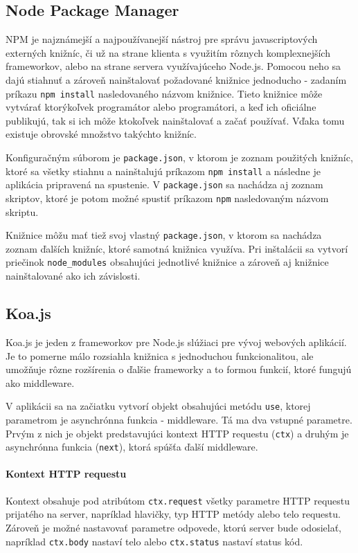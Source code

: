 \documentclass[
  digital, %
  table,   %
  lof,     %
  lot,     %
]{fithesis3}
\begin{document}
\subsection{Node Package Manager}
NPM je najznámejší a najpoužívanejší nástroj pre správu javascriptových externých knižníc, či už na strane klienta s využitím rôznych komplexnejších frameworkov, alebo na strane servera využívajúceho Node.js. Pomocou neho sa dajú stiahnuť a zároveň nainštalovať požadované knižnice jednoducho - zadaním príkazu \texttt{npm install} nasledovaného názvom knižnice. Tieto knižnice môže vytvárať ktorýkoľvek programátor alebo programátori, a keď ich oficiálne publikujú, tak si ich môže ktokoľvek nainštalovať a začať používať. Vďaka tomu existuje obrovské množstvo takýchto knižníc.

Konfiguračným súborom je \texttt{package.json}, v ktorom je zoznam použitých knižníc, ktoré sa všetky stiahnu a nainštalujú príkazom \texttt{npm install} a následne je aplikácia pripravená na spustenie. V \texttt{package.json} sa nachádza aj zoznam skriptov, ktoré je potom možné spustiť príkazom \texttt{npm} nasledovaným názvom skriptu.

Knižnice môžu mať tiež svoj vlastný \texttt{package.json}, v ktorom sa nachádza zoznam ďalších knižníc, ktoré samotná knižnica využíva. Pri inštalácii sa vytvorí priečinok \texttt{node\_modules} obsahujúci jednotlivé knižnice a zároveň aj knižnice nainštalované ako ich závislosti.

\subsection{Koa.js}
Koa.js je jeden z frameworkov pre Node.js slúžiaci pre vývoj webových aplikácií. Je to pomerne málo rozsiahla knižnica s jednoduchou funkcionalitou, ale umožňuje rôzne rozšírenia o ďalšie frameworky a to formou funkcií, ktoré fungujú ako middleware. 

V aplikácii sa na začiatku vytvorí objekt obsahujúci metódu \texttt{use}, ktorej parametrom je asynchrónna funkcia - middleware. Tá ma dva vstupné parametre. Prvým z nich je objekt predstavujúci kontext HTTP requestu (\texttt{ctx}) a druhým je asynchrónna funkcia (\texttt{next}), ktorá spúšťa ďalší middleware.

\paragraph{Kontext HTTP requestu}
Kontext obsahuje pod atribútom \texttt{ctx.request} všetky parametre HTTP requestu prijatého na server, napríklad hlavičky, typ HTTP metódy alebo telo requestu. Zároveň je možné nastavovať parametre odpovede, ktorú server bude odosielať, napríklad \texttt{ctx.body} nastaví telo alebo \texttt{ctx.status} nastaví status kód.
\end{document}
